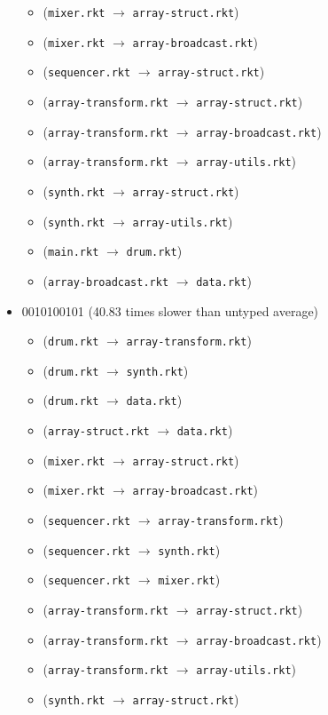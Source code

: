 \documentclass{article}
\newcommand{\mono}[1]{\texttt{#1}}
\begin{document}
\begin{itemize}
\begin{itemize}
  \item (\mono{mixer.rkt} $\rightarrow$ \mono{array-struct.rkt})
  \item (\mono{mixer.rkt} $\rightarrow$ \mono{array-broadcast.rkt})
  \item (\mono{sequencer.rkt} $\rightarrow$ \mono{array-struct.rkt})
  \item (\mono{array-transform.rkt} $\rightarrow$ \mono{array-struct.rkt})
  \item (\mono{array-transform.rkt} $\rightarrow$ \mono{array-broadcast.rkt})
  \item (\mono{array-transform.rkt} $\rightarrow$ \mono{array-utils.rkt})
  \item (\mono{synth.rkt} $\rightarrow$ \mono{array-struct.rkt})
  \item (\mono{synth.rkt} $\rightarrow$ \mono{array-utils.rkt})
  \item (\mono{main.rkt} $\rightarrow$ \mono{drum.rkt})
  \item (\mono{array-broadcast.rkt} $\rightarrow$ \mono{data.rkt})
  \end{itemize}
\item 0010100101 (40.83 times slower than untyped average)
  \begin{itemize}
  \item (\mono{drum.rkt} $\rightarrow$ \mono{array-transform.rkt})
  \item (\mono{drum.rkt} $\rightarrow$ \mono{synth.rkt})
  \item (\mono{drum.rkt} $\rightarrow$ \mono{data.rkt})
  \item (\mono{array-struct.rkt} $\rightarrow$ \mono{data.rkt})
  \item (\mono{mixer.rkt} $\rightarrow$ \mono{array-struct.rkt})
  \item (\mono{mixer.rkt} $\rightarrow$ \mono{array-broadcast.rkt})
  \item (\mono{sequencer.rkt} $\rightarrow$ \mono{array-transform.rkt})
  \item (\mono{sequencer.rkt} $\rightarrow$ \mono{synth.rkt})
  \item (\mono{sequencer.rkt} $\rightarrow$ \mono{mixer.rkt})
  \item (\mono{array-transform.rkt} $\rightarrow$ \mono{array-struct.rkt})
  \item (\mono{array-transform.rkt} $\rightarrow$ \mono{array-broadcast.rkt})
  \item (\mono{array-transform.rkt} $\rightarrow$ \mono{array-utils.rkt})
  \item (\mono{synth.rkt} $\rightarrow$ \mono{array-struct.rkt})

\end{itemize}
\end{itemize}
\end{document}
